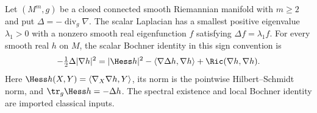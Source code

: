 Let $(M^m,g)$ be a closed connected smooth Riemannian manifold with $m\geq2$ and put
$\Delta=-\operatorname{div}_g\nabla$. The scalar Laplacian has a smallest
positive eigenvalue $\lambda_1>0$ with a nonzero smooth real eigenfunction
$f$ satisfying $\Delta f=\lambda_1 f$.
For every smooth real $h$ on $M$, the scalar Bochner identity in this sign convention is
\[
 -\tfrac12\Delta|\nabla h|^2
 =|\Hess h|^2-\langle\nabla\Delta h,\nabla h\rangle
   +\Ric(\nabla h,\nabla h).
\]
Here $\Hess h(X,Y)=\langle\nabla_X\nabla h,Y\rangle$, its norm is the
pointwise Hilbert--Schmidt norm, and $\tr_g\Hess h=-\Delta h$.
The spectral existence and local Bochner identity are imported classical inputs.